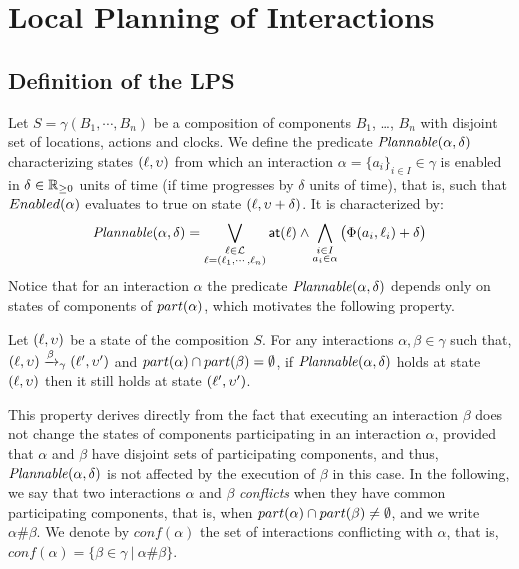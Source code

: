 \section{Local Planning of Interactions}
\subsection{Definition of the LPS}
\label{subsec:wp} 
Let $S=\gamma(B_1,\cdots,B_n)$ be a composition of components $B_1$, \ldots, $B_n$ with
disjoint set of locations, actions and clocks.
We define the predicate $\mathit{Plannable(\alpha,\delta)}$ characterizing states $(\ell, \upsilon)$
from which an interaction $\alpha = \{ a_i \}_{i \in I} \in \gamma$ is enabled in 
$\delta \in \mathbb{R}_{\ge 0}$ units of time (if time progresses by $\delta$ units of time),
that is, such that $Enabled(\alpha)$ evaluates to true on state $(\ell, \upsilon + \delta)$.
It is characterized by:
\begin{equation}\label{eq:enf1}
\mathit{Plannable(\alpha,\delta)} = \bigvee_{\substack{\ell\in\mathcal{L}\\\ell=(\ell_1,\cdots,\ell_n)}}
  \textsf{at}(\ell)\wedge\bigwedge_{\substack{i\in I\\a_i\in\alpha}}\big(\Phi(a_i,\ell_i) + \delta\big)
\end{equation}
Notice that for an interaction $\alpha$ the predicate $\mathit{Plannable(\alpha,\delta)}$ depends only 
on states of components of $part(\alpha)$, which motivates the following property.

\begin{property}\label{pt:plnIn1}
Let $(\ell,\upsilon)$ be a state of the composition $S$. For any interactions $\alpha,\beta\in\gamma$
such that, $(\ell,\upsilon)\xrightarrow{\beta}_{\gamma}(\ell',\upsilon')$ and $part(\alpha)\cap part(\beta)=
\emptyset$, if $\mathit{Plannable(\alpha,\delta)}$ holds at state $(\ell,\upsilon)$ then it still 
holds at state $(\ell',\upsilon')$.
\end{property}
This property derives directly from the fact that executing an interaction $\beta$ does 
not change the states of components participating in an interaction $\alpha$, 
provided that $\alpha$ and $\beta$ have disjoint sets of participating components, 
and thus, $\mathit{Plannable(\alpha,\delta)}$ is not affected by the execution of $\beta$ in this case.
In the following, we say that two interactions $\alpha$ and $\beta$ \emph{conflicts} when 
they have common participating components, that is, when $part(\alpha)\cap part(\beta)\neq\emptyset$, 
and we write $\alpha\#\beta$.
We denote by $conf(\alpha)$ the set of interactions conflicting with $\alpha$, that is, 
$conf(\alpha) = \{ \beta \in \gamma \ | \ \alpha\#\beta \}$.

